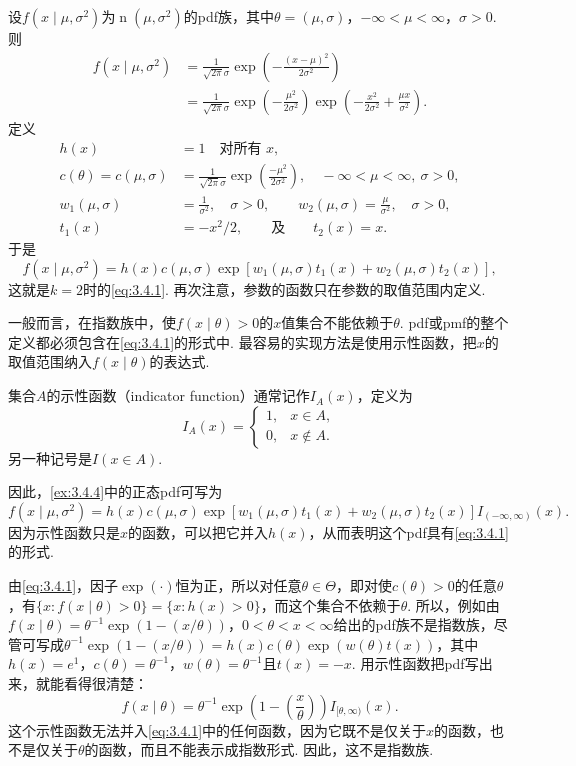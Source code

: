 \begin{example}[正态指数族]\label{ex:3.4.4}
设$f(x\mid\mu,\sigma^2)$为$\operatorname n(\mu,\sigma^2)$的pdf族，其中$\theta=(\mu,\sigma)$，$-\infty<\mu<\infty$，$\sigma>0$. 则
\begin{equation}\label{eq:3.4.6}
\begin{aligned}
f(x\mid\mu,\sigma^2)&=\frac1{\sqrt{2\pi}\sigma}\exp\left(-\frac{(x-\mu)^2}{2\sigma^2}\right)\\
&=\frac1{\sqrt{2\pi}\sigma}\exp\left(-\frac{\mu^2}{2\sigma^2}\right)\exp\left(-\frac{x^2}{2\sigma^2}+\frac{\mu x}{\sigma^2}\right).
\end{aligned}
\end{equation}
定义
\begin{align*}
h(x)&=1\quad\text{对所有 }x,\\
c(\theta)=c(\mu,\sigma)&=\frac1{\sqrt{2\pi}\sigma}\exp\left(\frac{-\mu^2}{2\sigma^2}\right),\quad-\infty<\mu<\infty,\ \sigma>0,\\
w_1(\mu,\sigma)&=\frac1{\sigma^2},\quad\sigma>0,\qquad w_2(\mu,\sigma)=\frac\mu{\sigma^2},\quad\sigma>0,\\
t_1(x)&=-x^2/2,\qquad\text{及}\qquad t_2(x)=x.
\end{align*}
于是
$$f(x\mid\mu,\sigma^2)=h(x)c(\mu,\sigma)\exp[w_1(\mu,\sigma)t_1(x)+w_2(\mu,\sigma)t_2(x)],$$
这就是$k=2$时的\eqref{eq:3.4.1}. 再次注意，参数的函数只在参数的取值范围内定义.
\end{example}
一般而言，在指数族中，使$f(x\mid\theta)>0$的$x$值集合不能依赖于$\theta$. pdf或pmf的整个定义都必须包含在\eqref{eq:3.4.1}的形式中. 最容易的实现方法是使用示性函数，把$x$的取值范围纳入$f(x\mid\theta)$的表达式.

\begin{definition}\label{def:3.4.5}
集合$A$的示性函数（indicator function）通常记作$I_A(x)$，定义为
$$I_A(x)=\begin{cases}1,&x\in A,\\0,&x\notin A.\end{cases}$$
另一种记号是$I(x\in A)$.
\end{definition}

因此，\autoref{ex:3.4.4}中的正态pdf可写为
$$f(x\mid\mu,\sigma^2)=h(x)c(\mu,\sigma)\exp[w_1(\mu,\sigma)t_1(x)+w_2(\mu,\sigma)t_2(x)]I_{(-\infty,\infty)}(x).$$
因为示性函数只是$x$的函数，可以把它并入$h(x)$，从而表明这个pdf具有\eqref{eq:3.4.1}的形式.

由\eqref{eq:3.4.1}，因子$\exp(\cdot)$恒为正，所以对任意$\theta\in\Theta$，即对使$c(\theta)>0$的任意$\theta$，有$\{x:f(x\mid\theta)>0\}=\{x:h(x)>0\}$，而这个集合不依赖于$\theta$. 所以，例如由$f(x\mid\theta)=\theta^{-1}\exp(1-(x/\theta))$，$0<\theta<x<\infty$给出的pdf族不是指数族，尽管可写成$\theta^{-1}\exp(1-(x/\theta))=h(x)c(\theta)\exp(w(\theta)t(x))$，其中$h(x)=e^1$，$c(\theta)=\theta^{-1}$，$w(\theta)=\theta^{-1}$且$t(x)=-x$. 用示性函数把pdf写出来，就能看得很清楚：
$$f(x\mid\theta)=\theta^{-1}\exp\left(1-\left(\frac x\theta\right)\right)I_{[\theta,\infty)}(x).$$
这个示性函数无法并入\eqref{eq:3.4.1}中的任何函数，因为它既不是仅关于$x$的函数，也不是仅关于$\theta$的函数，而且不能表示成指数形式. 因此，这不是指数族.

